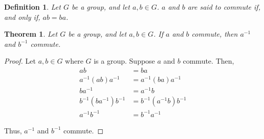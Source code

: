 \documentclass{article}
\newtheorem{definition}{Definition}
\newtheorem{theorem}{Theorem}
\begin{document}
\begin{definition}
Let $G$ be a group, and let $a,b \in G$. $a$ and $b$ are said to commute
if, and only if, $ab=ba$.
\end{definition}

\begin{theorem}
Let $G$ be a group, and let $a,b \in G$. If $a$ and $b$ commute, then
$a^{-1}$ and $b^{-1}$ commute.
\end{theorem}

\begin{proof}
Let $a,b \in G$ where $G$ is a group. Suppose $a$ and $b$ commute. Then,
\begin{align*}
 ab&=ba\\
a^{-1}(ab)a^{-1}&=a^{-1}(ba)a^{-1}\\
ba^{-1}&=a^{-1}b\\
b^{-1}(ba^{-1})b^{-1}&=b^{-1}(a^{-1}b)b^{-1}\\
a^{-1}b^{-1}&=b^{-1}a^{-1}
\end{align*}

Thus, $a^{-1}$ and $b^{-1}$ commute.
\end{proof}
\end{document}
